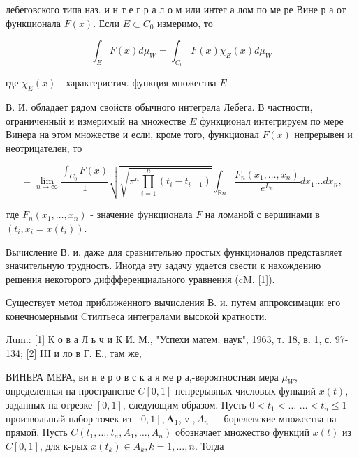 \documentclass[10pt]{article}
\begin{document}
лебеговского типа наз. и н т е г р а л о м или интег а лом по ме ре Вине р а от функционала $F(x)$. Если $E \subset C_{0}$ измеримо, то



\[

\int_{E} F(x) d \mu_{W}=\int_{C_{0}} F(x) \chi_{E}(x) d \mu_{W}

\]



где $\chi_{E}(x)$ - характеристич. функция множества $E$.



В. И. обладает рядом свойств обычного интеграла Лебега. В частности, ограниченный и измеримый на множестве $E$ функционал интегрируем по мере Винера на этом множестве и если, кроме того, функционал $F(x)$ непрерывен и неотрицателен, то



\[

=\lim _{n \rightarrow \infty} \frac{\int_{C_{0}} F(x)}{1} \sqrt{\sqrt{\pi^{n} \prod_{i=1}^{n}\left(t_{i}-t_{i-1}\right)}} \int_{\mathbb{R} n} \frac{F_{n}\left(x_{1}, \ldots, x_{n}\right)}{e^{L_{n}}} d x_{1} \ldots d x_{n},

\]



тде $F_{n}\left(x_{1}, \ldots, x_{n}\right)$ - значение функционала $F$ на ломаной с вершинами в $\left(t_{i}, x_{i}=x\left(t_{i}\right)\right)$.



Вычисление В. и. даже для сравнительно простых функционалов представляет значительную трудность. Иногда эту задачу удается свести к нахождению решения некоторого диффференциального уравнения (cM. [1]).



Существует метод приближенного вычисления В. и. путем аппроксимации его конечномерными Cтилтьеса интегралами высокой кратности.



Лum.: [1] К о в а Л ь ч и К И. М., "Успехи матем. наук", 1963, т. 18, в. 1, с. 97-134; [2] III и ло в Г. Е., там же,



ВИНЕРА МЕРА, ви н е р о в с к а я ме р а,-вeроятностная мера $\mu_{W}$, определенная на пространстве $C[0,1]$ непрерывных числовых функций $x(t)$, заданных на отрезке $[0,1]$, следующим образом. Пусть $0<t_{1}<\ldots$ $\ldots<t_{n} \leqslant 1$ - произвольный набор точек из $[0,1], \boldsymbol{A}_{1}$, $\because ., A_{n}-$ борелевские множества на прямой. Пусть $C\left(t_{1}, \ldots, t_{n}, A_{1}, \ldots, A_{n}\right)$ обозначает множество функций $x(t)$ из $C[0,1]$, для к-рых $x\left(t_{k}\right) \in A_{k}, k=1, \ldots, n$. Тогда
\end{document}
